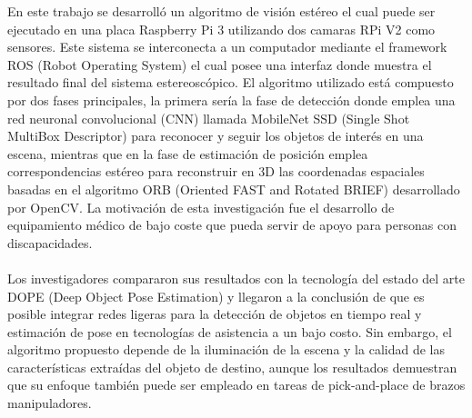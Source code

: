 En este trabajo se desarrolló un algoritmo de visión estéreo el cual puede ser ejecutado en una placa Raspberry Pi 3 utilizando dos camaras RPi V2 como sensores. Este sistema se interconecta a un computador mediante el framework ROS (Robot Operating System) el cual posee una interfaz donde muestra el resultado final del sistema estereoscópico. El algoritmo utilizado está compuesto por dos fases principales, la primera sería la fase de detección donde emplea una red neuronal convolucional (CNN) llamada MobileNet SSD (Single Shot MultiBox Descriptor) para reconocer y seguir los objetos de interés en una escena, mientras que en la fase de estimación de posición emplea correspondencias estéreo para reconstruir en 3D las coordenadas espaciales basadas en el algoritmo ORB (Oriented FAST and Rotated BRIEF) desarrollado por OpenCV. La motivación de esta investigación fue el desarrollo de equipamiento médico de bajo coste que pueda servir de apoyo para personas con discapacidades.
\\
\\
Los investigadores compararon sus resultados con la tecnología del estado del arte DOPE (Deep Object Pose Estimation) y llegaron a la conclusión de que es posible integrar redes ligeras para la detección de objetos en tiempo real y estimación de pose en tecnologías de asistencia a un bajo costo. Sin embargo, el algoritmo propuesto depende de la iluminación de la escena y la calidad de las características extraídas del objeto de destino, aunque los resultados demuestran que su enfoque también puede ser empleado en tareas de pick-and-place de brazos manipuladores.

